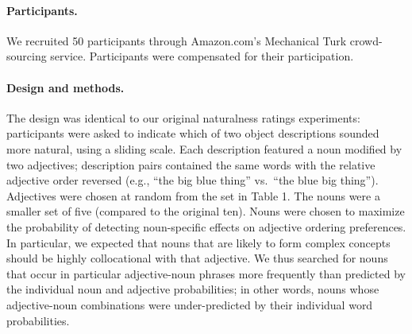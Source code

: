 \documentclass[12pt]{article}
\begin{document}

\paragraph{Participants.}

We recruited 50 participants through Amazon.com's Mechanical Turk crowd-sourcing service. Participants were compensated for their participation.

\paragraph{Design and methods.}

The design was identical to our original naturalness ratings experiments: participants were asked to indicate which of two object descriptions sounded more natural, using a sliding scale. Each description featured a noun modified by two adjectives; description pairs contained the same words with the relative adjective order reversed (e.g., ``the big blue thing'' vs.~``the blue big thing''). Adjectives were chosen at random from the set in Table 1. The nouns were a smaller set of five (compared to the original ten). Nouns were chosen to maximize the probability of detecting noun-specific effects on adjective ordering preferences. In particular, we expected that nouns that are likely to form complex concepts should be 
highly collocational with that adjective. We thus searched for nouns that occur in particular adjective-noun phrases more frequently than predicted by the individual noun and adjective probabilities; in other words, nouns whose adjective-noun combinations were under-predicted by their individual word probabilities. 
\end{document}
